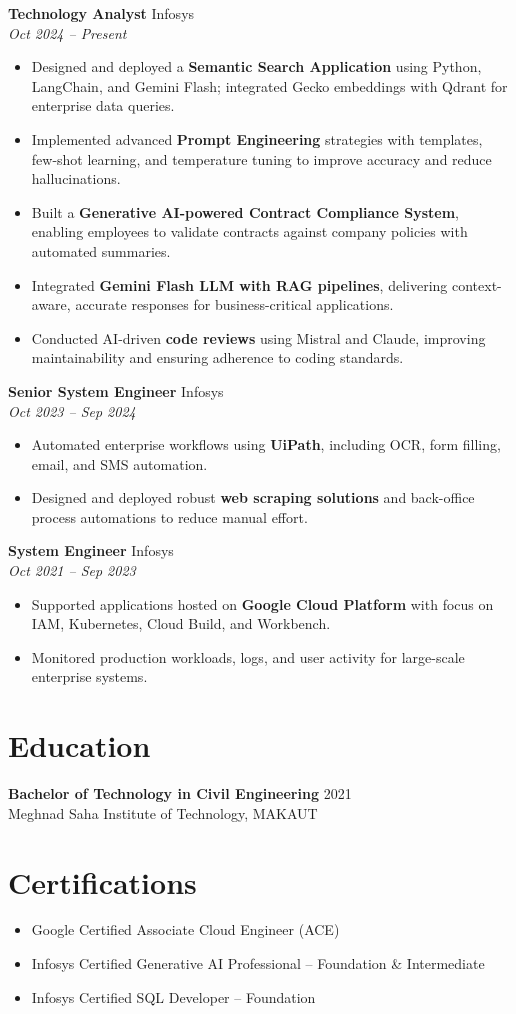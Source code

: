 \documentclass[a4paper,11pt]{article}
\begin{document}
\textbf{Technology Analyst} \hfill Infosys \\
\textit{Oct 2024 -- Present} 
\begin{itemize}
    \item Designed and deployed a \textbf{Semantic Search Application} using Python, LangChain, and Gemini Flash; integrated Gecko embeddings with Qdrant for enterprise data queries.
    \item Implemented advanced \textbf{Prompt Engineering} strategies with templates, few-shot learning, and temperature tuning to improve accuracy and reduce hallucinations.
    \item Built a \textbf{Generative AI-powered Contract Compliance System}, enabling employees to validate contracts against company policies with automated summaries.
    \item Integrated \textbf{Gemini Flash LLM with RAG pipelines}, delivering context-aware, accurate responses for business-critical applications.
    \item Conducted AI-driven \textbf{code reviews} using Mistral and Claude, improving maintainability and ensuring adherence to coding standards.
\end{itemize}

\textbf{Senior System Engineer} \hfill Infosys \\
\textit{Oct 2023 -- Sep 2024}
\begin{itemize}
    \item Automated enterprise workflows using \textbf{UiPath}, including OCR, form filling, email, and SMS automation.
    \item Designed and deployed robust \textbf{web scraping solutions} and back-office process automations to reduce manual effort.
\end{itemize}

\textbf{System Engineer} \hfill Infosys \\
\textit{Oct 2021 -- Sep 2023}
\begin{itemize}
    \item Supported applications hosted on \textbf{Google Cloud Platform} with focus on IAM, Kubernetes, Cloud Build, and Workbench.
    \item Monitored production workloads, logs, and user activity for large-scale enterprise systems.
\end{itemize}

\section*{Education}
\textbf{Bachelor of Technology in Civil Engineering} \hfill 2021 \\
Meghnad Saha Institute of Technology, MAKAUT

\section*{Certifications}
\begin{itemize}
    \item Google Certified Associate Cloud Engineer (ACE)
    \item Infosys Certified Generative AI Professional – Foundation \& Intermediate
    \item Infosys Certified SQL Developer – Foundation
\end{itemize}
\end{document}
